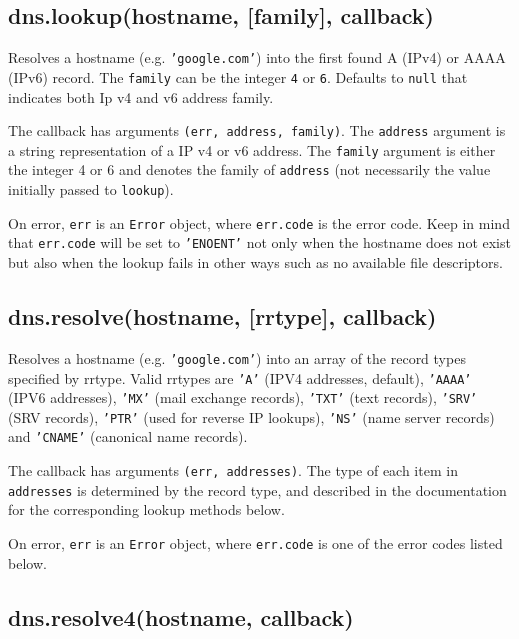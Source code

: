 \subsection{dns.lookup(hostname, {[}family{]}, callback)}

Resolves a hostname (e.g. \texttt{'google.com'}) into the first found A
(IPv4) or AAAA (IPv6) record. The \texttt{family} can be the integer
\texttt{4} or \texttt{6}. Defaults to \texttt{null} that indicates both
Ip v4 and v6 address family.

The callback has arguments \texttt{(err, address, family)}. The
\texttt{address} argument is a string representation of a IP v4 or v6
address. The \texttt{family} argument is either the integer 4 or 6 and
denotes the family of \texttt{address} (not necessarily the value
initially passed to \texttt{lookup}).

On error, \texttt{err} is an \texttt{Error} object, where
\texttt{err.code} is the error code. Keep in mind that \texttt{err.code}
will be set to \texttt{'ENOENT'} not only when the hostname does not
exist but also when the lookup fails in other ways such as no available
file descriptors.

\subsection{dns.resolve(hostname, {[}rrtype{]}, callback)}

Resolves a hostname (e.g. \texttt{'google.com'}) into an array of the
record types specified by rrtype. Valid rrtypes are \texttt{'A'} (IPV4
addresses, default), \texttt{'AAAA'} (IPV6 addresses), \texttt{'MX'}
(mail exchange records), \texttt{'TXT'} (text records), \texttt{'SRV'}
(SRV records), \texttt{'PTR'} (used for reverse IP lookups),
\texttt{'NS'} (name server records) and \texttt{'CNAME'} (canonical name
records).

The callback has arguments \texttt{(err, addresses)}. The type of each
item in \texttt{addresses} is determined by the record type, and
described in the documentation for the corresponding lookup methods
below.

On error, \texttt{err} is an \texttt{Error} object, where
\texttt{err.code} is one of the error codes listed below.

\subsection{dns.resolve4(hostname, callback)}

